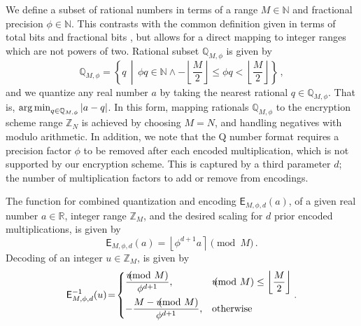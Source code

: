 \documentclass[10pt,letterpaper,oneside,twocolumn,journal]{IEEEtran}
\theoremstyle{definition}
\theoremstyle{definition}
\theoremstyle{remark}
\begin{document}
We define a subset of rational numbers in terms of a range $M \in \mathbb{N}$ and fractional precision $\phi \in \mathbb{N}$. This contrasts with the common definition given in terms of total bits and fractional bits \cite{oberstarFixedPointRepresentationFractional2007,schulzedarupEncryptedCooperativeControl2019,farokhiSecurePrivateControl2017}, but allows for a direct mapping to integer ranges which are not powers of two. Rational subset $\mathbb{Q}_{M,\phi}$ is given by
\begin{equation}
    \mathbb{Q}_{M,\phi} = \left\{q \,\middle|\, \phi q \in \mathbb{N} \wedge -\left\lfloor\frac{M}{2}\right\rfloor \leq \phi q < \left\lfloor\frac{M}{2}\right\rfloor \right\}\,,
\end{equation}
and we quantize any real number $a$ by taking the nearest rational $q \in \mathbb{Q}_{M,\phi}$. That is, $\operatorname*{arg\,min}_{q\in\mathbb{Q}_{M,\phi}} |a-q|$. In this form, mapping rationals $\mathbb{Q}_{M,\phi}$ to the encryption scheme range $\mathbb{Z}_N$ is achieved by choosing $M=N$, and handling negatives with modulo arithmetic. In addition, we note that the Q number format requires a precision factor $\phi$ to be removed after each encoded multiplication, which is not supported by our encryption scheme. This is captured by a third parameter $d$; the number of multiplication factors to add or remove from encodings.

The function for combined quantization and encoding $\mathsf{E}_{M,\phi,d}(a)$, of a given real number $a \in \mathbb{R}$, integer range $\mathbb{Z}_M$, and the desired scaling for $d$ prior encoded multiplications, is given by
\begin{equation}
    \mathsf{E}_{M,\phi,d}(a) = \left\lfloor \phi^{d+1} a \right\rceil \pmod{M}\,. \label{eqn:encode}
\end{equation}
Decoding of an integer $u \in \mathbb{Z}_M$, is given by
\begin{equation}
    \mathsf{E}^{-1}_{M,\phi,d}(u) \!=\! 
    \begin{dcases}
        \frac{u\hspace{-8pt}\pmod{M}}{\phi^{d+1}}, &u\hspace{-8pt}\pmod{M} \leq \left\lfloor\frac{M}{2}\right\rfloor \\
        -\frac{M - u\hspace{-8pt}\pmod{M}}{\phi^{d+1}}, &\text{otherwise} \\
    \end{dcases}.\label{eqn:decode}
\end{equation}
\end{document}
